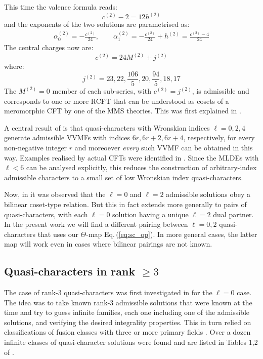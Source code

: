 \documentclass[11pt]{article}
\newcommand\be{\begin{equation}}
\newcommand\ee{\end{equation}}
\newcommand{\eref}[1]{Eq.\,(\ref{#1})}
\begin{document}
This time the valence formula reads:
\be
c^{(2)}-2=12h^{(2)}
\label{valence.2}
\ee
and the exponents of the two solutions are parametrised as:
\be
\begin{split}
\alpha_0^{(2)} = -\frac{c^{(2)}}{24},\qquad
\alpha_1^{(2)} = -\frac{c^{(2)}}{24}+h^{(2)}=\frac{c^{(2)}-4}{24}
\end{split}
\label{alphaelltwo}
\ee
The central charges now are:
\be
c^{(2)}=24M^{(2)}+j^{(2)}
\label{tcqcell.2}
\ee
where:
\be
j^{(2)}=23, 22, \frac{106}{5}, 20, \frac{94}{5}, 18, 17
\label{tjvalell.2}
\ee
The $M^{(2)} = 0$ member of each sub-series, with $c^{(2)}=j^{(2)}$, is admissible and corresponds to one or more RCFT that can be understood as cosets of a meromorphic CFT \cite{Schellekens:1992db} by one of the MMS theories. This was first explained in \cite{Gaberdiel:2016zke}.

A central result of \cite{Chandra:2018pjq} is that quasi-characters with Wronskian indices $\ell=0,2,4$ generate admissible VVMFs with indices $6r,6r+2,6r+4$, respectively, for every non-negative integer $r$ and moreoever {\em every} such VVMF can be obtained in this way. Examples
realised by actual CFTs were identified in \cite{Chandra:2018ezv, Das:2023qns}. Since the MLDEs with $\ell<6$ can be analysed explicitly, this reduces the construction of arbitrary-index admissible characters to a small set of low Wronskian index quasi-characters.

Now, in \cite{Gaberdiel:2016zke} it was observed that the $\ell=0$ and $\ell=2$ admissible solutions obey a bilinear  coset-type relation. But this in fact extends more generally to pairs of quasi-characters, with each $\ell=0$ solution having a unique $\ell=2$ dual partner.  In the present work we will find a different pairing between $\ell=0,2$ quasi-characters that uses our $\Theta$-map  \eref{eq:sc_op}. In more general cases, the latter map will work even in cases where bilinear pairings are not known.

\subsection{Quasi-characters in rank $\ge 3$}

The case of rank-3 quasi-characters was first investigated in \cite{Mukhi:2020gnj} for the $\ell=0$ case. The idea was to take known rank-3 admissible solutions that were known at the time \cite{Mathur:1988gt, Gaberdiel:2016zke, Hampapura:2016mmz,  franc2016hypergeometric} and try to guess infinite families, each one including one of the admissible solutions, and verifying the desired integrality properties. This in turn relied on classifications of fusion classes with three or more primary fields \cite{Christe:1988xy}. Over a dozen infinite classes of quasi-character solutions were found and are listed in Tables 1,2 of \cite{Mukhi:2020gnj}. 
\end{document}
